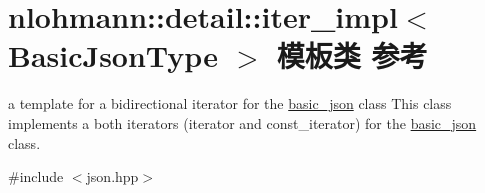\hypertarget{classnlohmann_1_1detail_1_1iter__impl}{}\section{nlohmann\+::detail\+::iter\+\_\+impl$<$ Basic\+Json\+Type $>$ 模板类 参考}
\label{classnlohmann_1_1detail_1_1iter__impl}


a template for a bidirectional iterator for the \mbox{\hyperlink{classnlohmann_1_1basic__json}{basic\+\_\+json}} class This class implements a both iterators (iterator and const\+\_\+iterator) for the \mbox{\hyperlink{classnlohmann_1_1basic__json}{basic\+\_\+json}} class.  




{\ttfamily \#include $<$json.\+hpp$>$}

